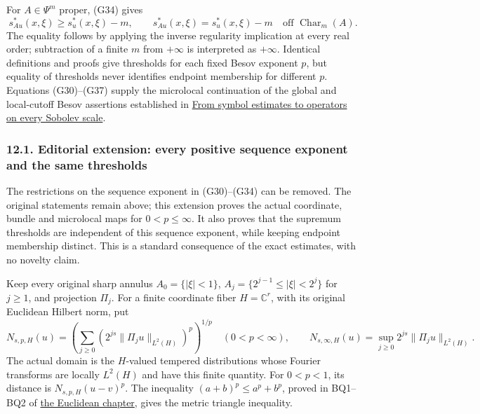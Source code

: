 \documentclass[
  11pt,
]{article}
\begin{document}
For \(A\in\Psi^m\) proper, (G34) gives \[
s_{Au}^*(x,\xi)\geq s_u^*(x,\xi)-m,
\qquad
s_{Au}^*(x,\xi)=s_u^*(x,\xi)-m
\quad\text{off }\operatorname{Char}_m(A).
\tag{G37}
\] The equality follows by applying the inverse regularity implication
at every real order; subtraction of a finite \(m\) from \(+\infty\) is
interpreted as \(+\infty\). Identical definitions and proofs give
thresholds for each fixed Besov exponent \(p\), but equality of
thresholds never identifies endpoint membership for different \(p\).
Equations (G30)--(G37) supply the microlocal continuation of the global
and local-cutoff Besov assertions established in
\href{euclidean-symbol-calculus.pdf}{From symbol estimates to operators
on every Sobolev scale}.

\subsubsection{12.1. Editorial extension: every positive sequence
exponent and the same
thresholds}\label{editorial-extension-every-positive-sequence-exponent-and-the-same-thresholds}

The restrictions on the sequence exponent in (G30)--(G34) can be
removed. The original statements remain above; this extension proves the
actual coordinate, bundle and microlocal maps for \(0<p\le\infty\). It
also proves that the supremum thresholds are independent of this
sequence exponent, while keeping endpoint membership distinct. This is a
standard consequence of the exact estimates, with no novelty claim.

Keep every original sharp annulus \(A_0=\{|\xi|<1\}\),
\(A_j=\{2^{j-1}\le|\xi|<2^j\}\) for \(j\ge1\), and projection \(\Pi_j\).
For a finite coordinate fiber \(H=\mathbb C^r\), with its original
Euclidean Hilbert norm, put \[
 N_{s,p,H}(u)=\left(\sum_{j\ge0}
       (2^{js}\|\Pi_j u\|_{L^2(H)})^p\right)^{1/p}
       \quad(0<p<\infty),\qquad
 N_{s,\infty,H}(u)=\sup_{j\ge0}2^{js}\|\Pi_j u\|_{L^2(H)}.
 \tag{GB1}
\] The actual domain is the \(H\)-valued tempered distributions whose
Fourier transforms are locally \(L^2(H)\) and have this finite quantity.
For \(0<p<1\), its distance is \(N_{s,p,H}(u-v)^p\). The inequality
\((a+b)^p\le a^p+b^p\), proved in BQ1--BQ2 of
\href{euclidean-symbol-calculus.pdf}{the Euclidean chapter}, gives the
metric triangle inequality.
\end{document}
